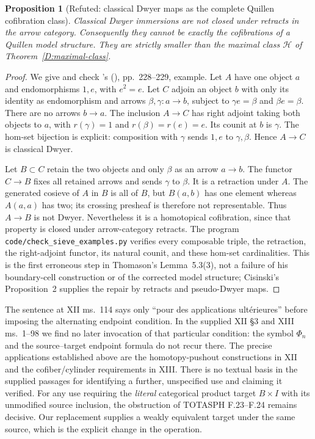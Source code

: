 \documentclass[11pt,a4paper]{article}
\newtheorem{proposition}[theorem]{Proposition}
\theoremstyle{definition}
\theoremstyle{remark}
\begin{document}
\begin{proposition}[Refuted: classical Dwyer maps as the complete Quillen cofibration class]\label{D:retract}
Classical Dwyer immersions are not closed under retracts in the arrow category. Consequently they cannot be exactly the cofibrations of a Quillen model structure. They are strictly smaller than the maximal class $\mathcal H$ of Theorem~\ref{D:maximal-class}.
\end{proposition}
\begin{proof}
We give and check \citeauthor{Cisinski1999}'s (\citeyear{Cisinski1999}), pp.~228--229, example. Let $A$ have one object $a$ and endomorphisms $1,e$, with $e^2=e$. Let $C$ adjoin an object $b$ with only its identity as endomorphism and arrows $\beta,\gamma:a\to b$, subject to $\gamma e=\beta$ and $\beta e=\beta$. There are no arrows $b\to a$. The inclusion $A\to C$ has right adjoint taking both objects to $a$, with $r(\gamma)=1$ and $r(\beta)=r(e)=e$. Its counit at $b$ is $\gamma$. The hom-set bijection is explicit: composition with $\gamma$ sends $1,e$ to $\gamma,\beta$. Hence $A\to C$ is classical Dwyer.

Let $B\subset C$ retain the two objects and only $\beta$ as an arrow $a\to b$. The functor $C\to B$ fixes all retained arrows and sends $\gamma$ to $\beta$. It is a retraction under $A$. The generated cosieve of $A$ in $B$ is all of $B$, but $B(a,b)$ has one element whereas $A(a,a)$ has two; its crossing presheaf is therefore not representable. Thus $A\to B$ is not Dwyer. Nevertheless it is a homotopical cofibration, since that property is closed under arrow-category retracts. The program \texttt{code/check\_sieve\_examples.py} verifies every composable triple, the retraction, the right-adjoint functor, its natural counit, and these hom-set cardinalities. This is the first erroneous step in Thomason's Lemma~5.3(3), not a failure of his boundary-cell construction or of the corrected model structure; Cisinski's Proposition~2 supplies the repair by retracts and pseudo-Dwyer maps.
\end{proof}

The sentence at XII ms.~114 says only ``pour des applications ult\'erieures'' before imposing the alternating endpoint condition. In the supplied XII \S3 and XIII ms.~1--98 we find no later invocation of that particular condition: the symbol $\Phi_n$ and the source--target endpoint formula do not recur there. The precise applications established above are the homotopy-pushout constructions in XII and the cofiber/cylinder requirements in XIII. There is no textual basis in the supplied passages for identifying a further, unspecified use and claiming it verified. For any use requiring the \emph{literal} categorical product target $B\times I$ with its unmodified source inclusion, the obstruction of TOTASPH F.23--F.24 remains decisive. Our replacement supplies a weakly equivalent target under the same source, which is the explicit change in the operation.
\end{document}
